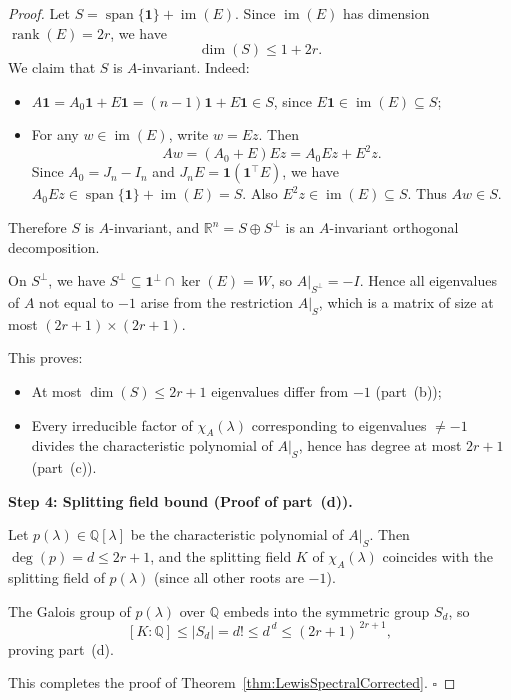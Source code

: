 \documentclass[10pt,a4paper]{amsart}
\begin{document}
\begin{proof}
Let $S = \operatorname{span}\{\mathbf{1}\} + \operatorname{im}(E)$. Since $\operatorname{im}(E)$ has dimension $\operatorname{rank}(E) = 2r$, we have
\[
\dim(S) \leq 1 + 2r.
\]
We claim that $S$ is $A$-invariant. Indeed:
\begin{itemize}
    \item $A\mathbf{1} = A_0\mathbf{1} + E\mathbf{1} = (n-1)\mathbf{1} + E\mathbf{1} \in S$, since $E\mathbf{1} \in \operatorname{im}(E) \subseteq S$;
    \item For any $w \in \operatorname{im}(E)$, write $w = Ez$. Then
    \[
    Aw = (A_0 + E)Ez = A_0 Ez + E^2 z.
    \]
    Since $A_0 = J_n - I_n$ and $J_n E = \mathbf{1}(\mathbf{1}^\top E)$, we have $A_0 Ez \in \operatorname{span}\{\mathbf{1}\} + \operatorname{im}(E) = S$. Also $E^2 z \in \operatorname{im}(E) \subseteq S$. Thus $Aw \in S$.
\end{itemize}
Therefore $S$ is $A$-invariant, and $\mathbb{R}^n = S \oplus S^\perp$ is an $A$-invariant orthogonal decomposition.

On $S^\perp$, we have $S^\perp \subseteq \mathbf{1}^\perp \cap \ker(E) = W$, so $A|_{S^\perp} = -I$. Hence all eigenvalues of $A$ not equal to $-1$ arise from the restriction $A|_S$, which is a matrix of size at most $(2r+1) \times (2r+1)$.

This proves:
\begin{itemize}
    \item At most $\dim(S) \leq 2r+1$ eigenvalues differ from $-1$ (part~\textup{(b)});
    \item Every irreducible factor of $\chi_A(\lambda)$ corresponding to eigenvalues $\neq -1$ divides the characteristic polynomial of $A|_S$, hence has degree at most $2r+1$ (part~\textup{(c)}).
\end{itemize}

\medskip
\noindent\textbf{Step 4: Splitting field bound (Proof of part~\textup{(d)}).}

Let $p(\lambda) \in \mathbb{Q}[\lambda]$ be the characteristic polynomial of $A|_S$. Then $\deg(p) = d \leq 2r+1$, and the splitting field $K$ of $\chi_A(\lambda)$ coincides with the splitting field of $p(\lambda)$ (since all other roots are $-1$).

The Galois group of $p(\lambda)$ over $\mathbb{Q}$ embeds into the symmetric group $S_d$, so
\[
[K:\mathbb{Q}] \leq |S_d| = d! \leq d^{\,d} \leq (2r+1)^{\,2r+1},
\]
proving part~\textup{(d)}.

\medskip
This completes the proof of Theorem~\ref{thm:LewisSpectralCorrected}. \hfill $\square$
\end{proof}
\end{document}
